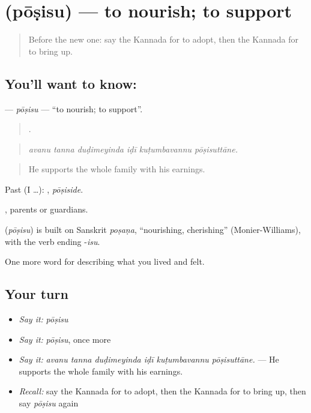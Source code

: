 \section[\texorpdfstring{\kn{ಪೋಷಿಸು} (pōṣisu)}{ಪೋಷಿಸು (pōṣisu)}]{ (pōṣisu) — to nourish; to support}

\label{lesson:KA-C527-posisu}



\begin{quote}
Before the new one: say the Kannada for to adopt, then the Kannada for to bring up.
\end{quote}

\subsection*{You'll want to know: }
\textbf{} — \emph{pōṣisu} — \textquotedblleft{}to nourish; to support\textquotedblright{}.

\begin{quote}
     .
\end{quote}

\begin{quote}
\emph{avanu tanna duḍimeyinda iḍī kuṭumbavannu pōṣisuttāne.}
\end{quote}

\begin{quote}
He supports the whole family with his earnings.
\end{quote}

Past (I …): , \emph{pōṣiside}.

, parents or guardians.

\begin{cousinweb}
\textbf{} (\emph{pōṣisu}) is built on Sanskrit \emph{poṣaṇa}, \textquotedblleft{}nourishing, cherishing\textquotedblright{} (Monier-Williams), with the verb ending -\emph{isu}.
\end{cousinweb}

\begin{grammarlens}[title={What you've built}]
One more word for describing what you lived and felt.
\end{grammarlens}

\subsection*{Your turn}
\begin{itemize}
\raggedright
  \item \emph{Say it:} \emph{pōṣisu}
  \item \emph{Say it:} \emph{pōṣisu}, once more
  \item \emph{Say it:} \emph{avanu tanna duḍimeyinda iḍī kuṭumbavannu pōṣisuttāne.} — He supports the whole family with his earnings.
  \item \emph{Recall:} say the Kannada for to adopt, then the Kannada for to bring up, then say \emph{pōṣisu} again
\end{itemize}

